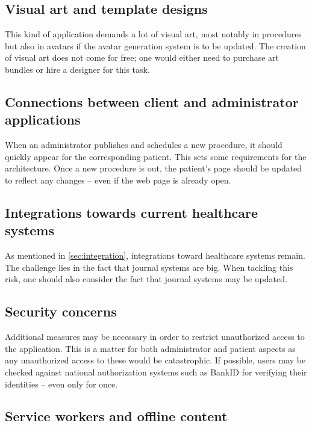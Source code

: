\subsection{Visual art and template designs}

This kind of application demands a lot of visual art, most notably in procedures but also in avatars if the avatar generation system is to be updated. The creation of visual art does not come for free; one would either need to purchase art bundles or hire a designer for this task.

\subsection{Connections between client and administrator applications}

When an administrator publishes and schedules a new procedure, it should quickly appear for the corresponding patient. This sets some requirements for the architecture. Once a new procedure is out, the patient's page should be updated to reflect any changes -- even if the web page is already open.

\subsection{Integrations towards current healthcare systems}

As mentioned in \autoref{sec:integration}, integrations toward healthcare systems remain. The challenge lies in the fact that journal systems are big. When tackling this risk, one should also consider the fact that journal systems may be updated.

\subsection{Security concerns}

Additional measures may be necessary in order to restrict unauthorized access to the application. This is a matter for both administrator and patient aspects as any unauthorized access to these would be catastrophic. If possible, users may be checked against national authorization systems such as BankID for verifying their identities -- even only for once.

\subsection{Service workers and offline content}

